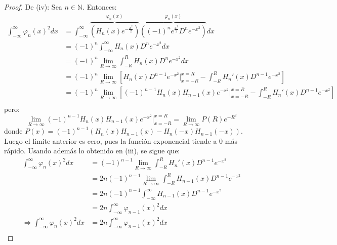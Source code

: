 \documentclass[12pt]{report}
\theoremstyle{largebreak}
\begin{document}
\begin{proof}
        De (iv): Sea $n\in\mathbb{N}$. Entonces:
        \begin{equation*}
            \begin{split}
                \int_{ -\infty}^\infty\varphi_n(x)^2dx&=\int_{ -\infty}^\infty \overbrace{\left(H_n(x)e^{-\frac{x^2}{2}}\right)}^{\varphi_n(x)} \overbrace{\left((-1)^ne^{\frac{x^2}{2}}D^ne^{-x^2} \right)}^{\varphi_n(x)} dx\\
                &=(-1)^n\int_{ -\infty}^\infty H_n(x)D^ne^{-x^2}dx\\
                &=(-1)^n\lim_{R\rightarrow\infty}\int_{ -R}^R H_n(x)D^ne^{-x^2}dx\\
                &=(-1)^n\lim_{R\rightarrow\infty}\left[H_n(x)D^{n-1} e^{-x^2}\Big|_{x=-R}^{x=R}-\int_{-R}^R H_n'(x)D^{n-1}e^{-x^2} \right]\\
                &=(-1)^n\lim_{R\rightarrow\infty}\left[(-1)^{n-1}H_n(x)H_{ n-1}(x)e^{-x^2} \Big|_{x=-R}^{x=R}-\int_{-R}^R H_n'(x)D^{n-1}e^{-x^2} \right]\\
            \end{split}
        \end{equation*}
        pero:
        \begin{equation*}
            \lim_{R\rightarrow\infty}(-1)^{n-1}H_n(x)H_{ n-1}(x)e^{-x^2} \Big|_{x=-R}^{x=R}=\lim_{R\rightarrow\infty} P(R)e^{-R^2}
        \end{equation*}
        donde $P(x)=(-1)^{n-1}\left(H_n(x)H_{ n-1}(x)-H_n(-x)H_{ n-1}(-x)\right)$. Luego el límite anterior es cero, pues la función exponencial tiende a 0 más rápido. Usando además lo obtenido en (iii), se sigue que:
        \begin{equation*}
            \begin{split}
                \int_{ -\infty}^\infty\varphi_n(x)^2dx&=(-1)^{n-1}\lim_{R\rightarrow\infty}\int_{-R}^R H_n'(x)D^{n-1}e^{-x^2}\\
                &=2n(-1)^{n-1}\lim_{R\rightarrow\infty}\int_{-R}^R H_{ n-1}(x)D^{n-1}e^{-x^2}\\
                &=2n(-1)^{n-1}\int_{-\infty}^\infty H_{ n-1}(x)D^{n-1}e^{-x^2}\\
                &=2n\int_{ -\infty}^\infty\varphi_{ n-1}(x)^2dx\\
                \Rightarrow \int_{ -\infty}^\infty\varphi_n(x)^2dx&=2n\int_{ -\infty}^\infty\varphi_{ n-1}(x)^2dx\\
            \end{split}
        \end{equation*}

\end{proof}
\end{document}

